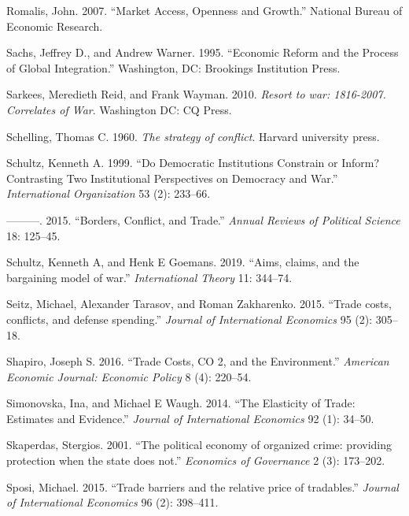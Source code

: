 \documentclass{puthesis}
\newlength{\cslhangindent}
\newenvironment{cslreferences}%
  {\setlength{\parindent}{0pt}%
  \everypar{\setlength{\hangindent}{\cslhangindent}}\ignorespaces}%
  {\par}
\begin{document}
\begin{cslreferences}
\leavevmode\hypertarget{ref-Romalis2007}{}%
Romalis, John. 2007. ``Market Access, Openness and Growth.'' National
Bureau of Economic Research.

\leavevmode\hypertarget{ref-Sachs1995}{}%
Sachs, Jeffrey D., and Andrew Warner. 1995. ``Economic Reform and the
Process of Global Integration.'' Washington, DC: Brookings Institution
Press.

\leavevmode\hypertarget{ref-Sarkees2010}{}%
Sarkees, Meredieth Reid, and Frank Wayman. 2010. \emph{Resort to war:
1816-2007. Correlates of War}. Washington DC: CQ Press.

\leavevmode\hypertarget{ref-Schelling1960}{}%
Schelling, Thomas C. 1960. \emph{The strategy of conflict}. Harvard
university press.

\leavevmode\hypertarget{ref-Schultz1999}{}%
Schultz, Kenneth A. 1999. ``Do Democratic Institutions Constrain or
Inform? Contrasting Two Institutional Perspectives on Democracy and
War.'' \emph{International Organization} 53 (2): 233--66.

\leavevmode\hypertarget{ref-Schultz2015}{}%
---------. 2015. ``Borders, Conflict, and Trade.'' \emph{Annual Reviews
of Political Science} 18: 125--45.

\leavevmode\hypertarget{ref-Schultz2019}{}%
Schultz, Kenneth A, and Henk E Goemans. 2019. ``Aims, claims, and the
bargaining model of war.'' \emph{International Theory} 11: 344--74.

\leavevmode\hypertarget{ref-Seitz2015}{}%
Seitz, Michael, Alexander Tarasov, and Roman Zakharenko. 2015. ``Trade
costs, conflicts, and defense spending.'' \emph{Journal of International
Economics} 95 (2): 305--18.

\leavevmode\hypertarget{ref-Shapiro2016}{}%
Shapiro, Joseph S. 2016. ``Trade Costs, CO 2, and the Environment.''
\emph{American Economic Journal: Economic Policy} 8 (4): 220--54.

\leavevmode\hypertarget{ref-Simonovska2014}{}%
Simonovska, Ina, and Michael E Waugh. 2014. ``The Elasticity of Trade:
Estimates and Evidence.'' \emph{Journal of International Economics} 92
(1): 34--50.

\leavevmode\hypertarget{ref-Skaperdas2001}{}%
Skaperdas, Stergios. 2001. ``The political economy of organized crime:
providing protection when the state does not.'' \emph{Economics of
Governance} 2 (3): 173--202.

\leavevmode\hypertarget{ref-Sposi2015}{}%
Sposi, Michael. 2015. ``Trade barriers and the relative price of
tradables.'' \emph{Journal of International Economics} 96 (2): 398--411.


\end{cslreferences}
\end{document}
